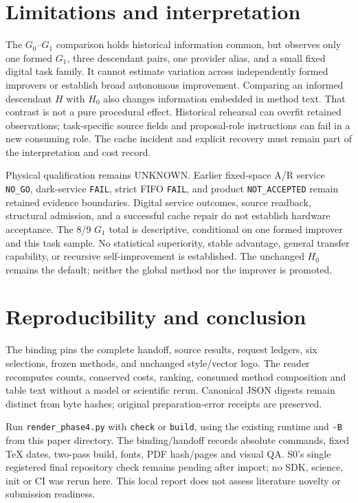 \section{Limitations and interpretation}

The $G_0$--$G_1$ comparison holds historical information common, but observes
only one formed $G_1$, three descendant pairs, one provider alias, and a small
fixed digital task family. It cannot estimate variation across independently
formed improvers or establish broad autonomous improvement. Comparing an
informed descendant $H$ with $H_0$ also changes information embedded in method
text. That contrast is not a pure procedural effect. Historical rehearsal
can overfit retained observations; task-specific source fields and
proposal-role instructions can fail in a new consuming role. The cache
incident and explicit recovery must remain part of the interpretation and
cost record.

Physical qualification remains UNKNOWN. Earlier fixed-space A/R service
\texttt{NO\_GO}, dark-service \texttt{FAIL}, strict FIFO \texttt{FAIL}, and product
\texttt{NOT\_ACCEPTED} remain retained evidence boundaries. Digital service
outcomes, source readback, structural admission, and a successful cache repair
do not establish hardware acceptance. The 8/9 $G_1$ total is descriptive,
conditional on one formed improver and this task sample. No statistical
superiority, stable advantage, general transfer capability, or recursive
self-improvement is established. The unchanged $H_0$ remains the default;
neither the global method nor the improver is promoted.

\section{Reproducibility and conclusion}

The binding pins the complete handoff, source results, request ledgers, six
selections, frozen methods, and unchanged style/vector logo. The reader
recomputes counts, conserved costs, ranking, consumed method composition and
table text without a model or scientific rerun. Canonical JSON digests remain
distinct from byte hashes; original preparation-error receipts are preserved.

Run \texttt{render\_phase4.py} with \texttt{check} or \texttt{build}, using
the existing runtime and \texttt{-B} from this paper directory.
The binding/handoff records absolute commands, fixed TeX dates, two-pass build,
fonts, PDF hash/pages and visual QA. S0's single registered final repository
check remains pending after import; no SDK, science, init or CI was rerun here.
This local report does not assess literature novelty or submission readiness.

